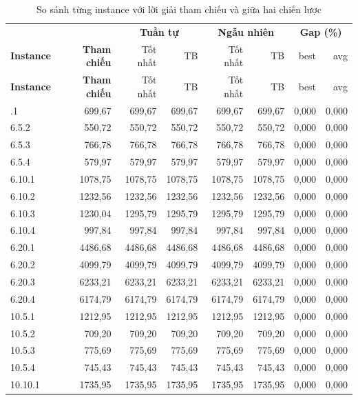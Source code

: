 \documentclass[../DoAn.tex]{subfiles}
\begin{document}
\begin{small}
\begin{longtable}{l|r|rr|rr|rr}
\caption{So sánh từng instance với lời giải tham chiếu và giữa hai chiến lược}\label{tab:appA_gap}\\
\toprule
 & & \multicolumn{2}{c|}{\textbf{Tuần tự}} & \multicolumn{2}{c|}{\textbf{Ngẫu nhiên}} & \multicolumn{2}{c}{\textbf{Gap (\%)}} \\
\textbf{Instance} & \textbf{Tham chiếu} & Tốt nhất & TB & Tốt nhất & TB & best & avg \\
\midrule
\endfirsthead
\toprule
\textbf{Instance} & \textbf{Tham chiếu} & Tốt nhất & TB & Tốt nhất & TB & best & avg \\
\midrule
\endhead
\bottomrule
\endfoot
6.5.1 & 699,67 & 699,67 & 699,67 & 699,67 & 699,67 & 0,000 & 0,000 \\
6.5.2 & 550,72 & 550,72 & 550,72 & 550,72 & 550,72 & 0,000 & 0,000 \\
6.5.3 & 766,78 & 766,78 & 766,78 & 766,78 & 766,78 & 0,000 & 0,000 \\
6.5.4 & 579,97 & 579,97 & 579,97 & 579,97 & 579,97 & 0,000 & 0,000 \\
6.10.1 & 1078,75 & 1078,75 & 1078,75 & 1078,75 & 1078,75 & 0,000 & 0,000 \\
6.10.2 & 1232,56 & 1232,56 & 1232,56 & 1232,56 & 1232,56 & 0,000 & 0,000 \\
6.10.3 & 1230,04 & 1295,79 & 1295,79 & 1295,79 & 1295,79 & 0,000 & 0,000 \\
6.10.4 & 997,84 & 997,84 & 997,84 & 997,84 & 997,84 & 0,000 & 0,000 \\
6.20.1 & 4486,68 & 4486,68 & 4486,68 & 4486,68 & 4486,68 & 0,000 & 0,000 \\
6.20.2 & 4099,79 & 4099,79 & 4099,79 & 4099,79 & 4099,79 & 0,000 & 0,000 \\
6.20.3 & 6233,21 & 6233,21 & 6233,21 & 6233,21 & 6233,21 & 0,000 & 0,000 \\
6.20.4 & 6174,79 & 6174,79 & 6174,79 & 6174,79 & 6174,79 & 0,000 & 0,000 \\
10.5.1 & 1212,95 & 1212,95 & 1212,95 & 1212,95 & 1212,95 & 0,000 & 0,000 \\
10.5.2 & 709,20 & 709,20 & 709,20 & 709,20 & 709,20 & 0,000 & 0,000 \\
10.5.3 & 775,69 & 775,69 & 775,69 & 775,69 & 775,69 & 0,000 & 0,000 \\
10.5.4 & 745,43 & 745,43 & 745,43 & 745,43 & 745,43 & 0,000 & 0,000 \\
10.10.1 & 1735,95 & 1735,95 & 1735,95 & 1735,95 & 1735,95 & 0,000 & 0,000 \\

\end{longtable}
\end{small}
\end{document}
